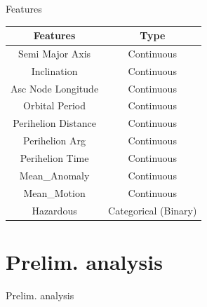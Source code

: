 \documentclass{beamer}
\begin{document}
\begin{frame}{Features}
\begin{table}[]
\begin{center}
\begin{tabular}{c|c}
\hline
\textbf{Features}             & \textbf{Type}        \\ \hline
Semi Major Axis               & Continuous           \\ \hline
Inclination                   & Continuous           \\ \hline
Asc Node Longitude            & Continuous           \\ \hline
Orbital Period                & Continuous           \\ \hline
Perihelion Distance           & Continuous           \\ \hline
Perihelion Arg                & Continuous           \\ \hline
Perihelion Time               & Continuous           \\ \hline
Mean\_Anomaly                 & Continuous           \\ \hline
Mean\_Motion                  & Continuous           \\ \hline
Hazardous                     & Categorical (Binary)
\end{tabular}
\end{center}
\label{tab_features}
\end{table}

\end{frame}


\section{Prelim. analysis}

\begin{frame}{}
\begin{center}
{\Huge Prelim. analysis}
\end{center}
\end{frame}
\end{document}
